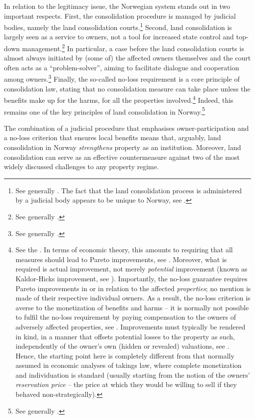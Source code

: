 In relation to the legitimacy issue, the Norwegian system stands out in two important respects. First, the consolidation procedure is managed by judicial bodies, namely the land consolidation courts.\footnote{See generally \cite{langbach09}. The fact that the land consolidation process is administered by a judicial body appears to be unique to Norway, see \cite[45]{sky01}.} Second, land consolidation is largely seen as a service to owners, not a tool for increased state control and top-down management.\footnote{See generally \cite{sky09}.} In particular, a case before the land consolidation courts is almost always initiated by (some of) the affected owners themselves and the court often acts as a ``problem-solver'', aiming to facilitate dialogue and cooperation among owners.\footnote{See generally \cite{rognes98,rognes03,rognes07}.} Finally, the so-called no-loss requirement is a core principle of consolidation law, stating that no consolidation measure can take place unless the benefits make up for the harms, for all the properties involved.\footnote{See the \dni\cite[3 a)]{lca79}. In terms of economic theory, this amounts to requiring that all measures should lead to Pareto improvements, see \cite[59-61]{miceli11}. Moreover, what is required is actual improvement, not merely {\it potential} improvement (known as Kaldor-Hicks improvement, see \cite[61-63]{miceli11}). Importantly, the no-loss guarantee requires Pareto improvements in or in relation to the affected {\it properties}; no mention is made of their respective individual owners. As a result, the no-loss criterion is averse to the monetization of benefits and harms -- it is normally not possible to fulfil the no-loss requirement by paying compensation to the owners of adversely affected properties, see \cite[394]{sky09}. Improvements must typically be rendered in kind, in a manner that offsets potential losses to the property as such, independently of the owner's own (hidden or revealed) valuations, see \cite[371-372]{sky09}. Hence, the starting point here is completely different from that normally assumed in economic analyses of takings law, where complete monetization and individuation is standard (usually starting from the notion of the owners' {\it reservation price} -- the price at which they would be willing to sell if they behaved non-strategically).} Indeed, this remains one of the key principles of land consolidation in Norway.\footnote{See generally \cite{rygg98}.}

The combination of a judicial procedure that emphasises owner-participation and a no-loss criterion that ensures local benefits means that, arguably, land consolidation in Norway {\it strengthens} property as an institution. Moreover, land consolidation can serve as an effective countermeasure against two of the most widely discussed challenges to any property regime. 

